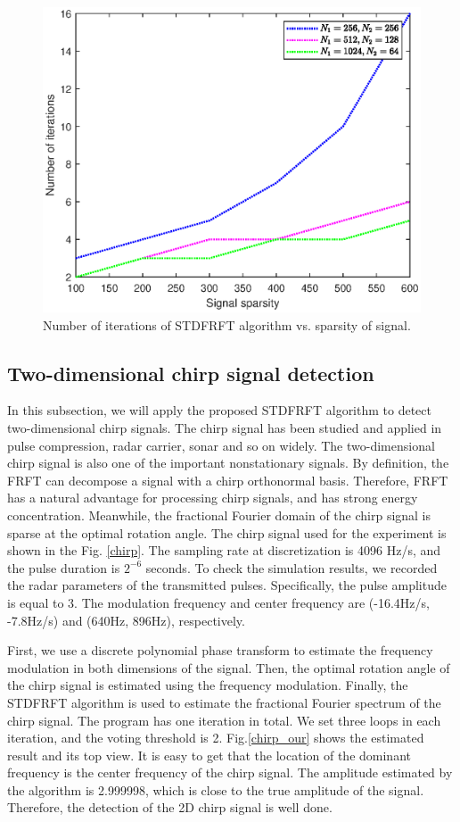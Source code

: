 \documentclass[conference]{IEEEtran}
\begin{document}
\begin{figure}[t]
	\centerline{\includegraphics[width=65 mm]{fig/converge.eps}}
	\caption{{Number of iterations of STDFRFT algorithm vs. sparsity of signal.}}
	\label{converge}
\end{figure}

\subsection{Two-dimensional chirp signal detection}
 In this subsection, we will apply the proposed STDFRFT algorithm to detect two-dimensional chirp signals. The chirp signal has been studied and applied in pulse compression, radar carrier, sonar and so on widely. The two-dimensional chirp signal is also one of the important nonstationary signals. By definition, the FRFT can decompose a signal with a chirp orthonormal basis. Therefore, FRFT has a natural advantage for processing chirp signals, and has strong energy concentration. Meanwhile, the fractional Fourier domain of the chirp signal is sparse at the optimal rotation angle. The chirp signal used for the experiment is shown in the Fig. \ref{chirp}. The sampling rate at discretization is 4096 Hz/s, and the pulse duration is $2^{-6}$ seconds. To check the simulation results, we recorded the radar parameters of the transmitted pulses. Specifically, the pulse amplitude is equal to 3. The modulation frequency and center frequency are (-16.4Hz/s, -7.8Hz/s) and (640Hz, 896Hz), respectively.

 First, we use a discrete polynomial phase transform to estimate the frequency modulation in both dimensions of the signal. Then, the optimal rotation angle of the chirp signal is estimated using the frequency modulation. Finally, the STDFRFT algorithm is used to estimate the fractional Fourier spectrum of the chirp signal. The program has one iteration in total. We set three loops in each iteration, and the voting threshold is 2. Fig.\ref{chirp_our} shows the estimated result and its top view. It is easy to get that the location of the dominant frequency is the center frequency of the chirp signal. The amplitude estimated by the algorithm is 2.999998, which is close to the true amplitude of the signal. Therefore, the detection of the 2D chirp signal is well done.
\end{document}
